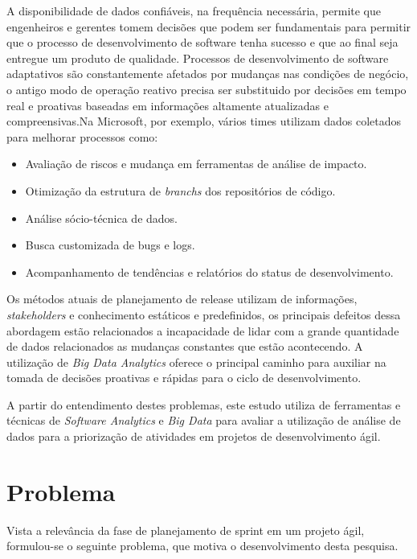 A disponibilidade de dados confiáveis, na frequência necessária, permite que
engenheiros e gerentes tomem decisões que podem ser fundamentais para permitir
que o processo de desenvolvimento de software tenha sucesso e que ao final seja
entregue um produto de qualidade\cite{codemine}. Processos de desenvolvimento
de software adaptativos são constantemente afetados por mudanças nas condições
de negócio, o antigo modo de operação reativo precisa ser substituido por decisões
em tempo real e proativas baseadas em informações altamente atualizadas e
compreensivas\cite{artAndScience}.Na Microsoft, por exemplo, vários times utilizam
dados coletados para melhorar processos como:

\begin{itemize}
    \item Avaliação de riscos e mudança em ferramentas de análise de impacto.
    \item Otimização da estrutura de \textit{branchs} dos repositórios de código.
    \item Análise sócio-técnica de dados.
    \item Busca customizada de bugs e logs.
    \item Acompanhamento de tendências e relatórios do status de desenvolvimento.
\end{itemize}

Os métodos atuais de planejamento de release utilizam de informações, \textit{stakeholders}
e conhecimento estáticos e predefinidos, os principais defeitos dessa abordagem
estão relacionados a incapacidade de lidar com a grande quantidade de dados
relacionados as mudanças constantes que estão acontecendo. A utilização de
\textit{Big Data Analytics} oferece o principal caminho para auxiliar na tomada
de decisões proativas e rápidas para o ciclo de desenvolvimento\cite{artAndScience}.

A partir do entendimento destes problemas, este estudo utiliza de ferramentas
e técnicas de \textit{Software Analytics} e \textit{Big Data} para avaliar a
utilização de análise de dados para a priorização de atividades em projetos de
desenvolvimento ágil.

\section{Problema}

Vista a relevância da fase de planejamento de sprint em um projeto ágil,
formulou-se o seguinte problema, que motiva o desenvolvimento desta pesquisa.

